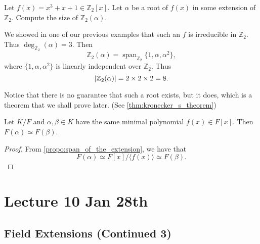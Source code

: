 \documentclass[notoc,notitlepage]{tufte-book}
\DeclareMathOperator{\Span}{span}
\begin{document}
\begin{eg}
  Let $f(x) = x^3 + x + 1 \in \mathbb{Z}_2[x]$. Let $\alpha$ be a root of $f(x)$ in some extension of
  $\mathbb{Z}_2$. Compute the size of $\mathbb{Z}_2(\alpha)$.
\end{eg}

\begin{solution}
  We showed in one of our previous examples that such an $f$ is irreducible in $\mathbb{Z}_2$. Thus
  $\deg_{\mathbb{Z}_2}(\alpha) = 3$. Then
  \begin{equation*}
    \mathbb{Z}_2(\alpha) = \Span_{\mathbb{Z}_2} \{ 1, \alpha, \alpha^2 \}, 
  \end{equation*}
  where $\{ 1, \alpha, \alpha^2 \}$ is linearly independent over $\mathbb{Z}_2$. Thus
  \begin{equation*}
    \left|\mathbb{Z}_2(\alpha)\right| = 2 \times 2 \times 2 = 8.
  \end{equation*}
\end{solution}

\begin{note}
  Notice that there is no guarantee that such a root exists, but it does, which is a theorem that we shall
  prove later. (See \cref{thm:kronecker_s_theorem})
\end{note}

\begin{crly}\label{crly:isomorphism_between_extensions}
  Let $K / F$ and $\alpha, \beta \in K$ have the same minimal polynomial $f(x) \in F[x]$. Then
  $F(\alpha) \simeq F(\beta)$.
\end{crly}

\begin{proof}
  From \cref{propo:span_of_the_extension}, we have that
  \begin{equation*}
    F(\alpha) \simeq F[x] / \langle f(x) \rangle \simeq F(\beta).
  \end{equation*}
\end{proof}



\chapter{Lecture 10 Jan 28th}%
\label{chp:lecture_10_jan_28th}

\section{Field Extensions (Continued 3)}%
\label{sec:field_extensions_continued_3}
\end{document}
